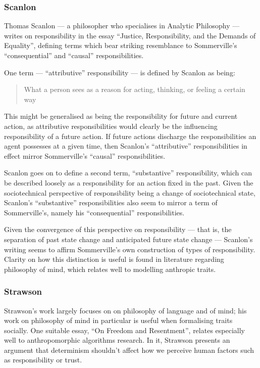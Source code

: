 \subsubsection{Scanlon~\cite{scanlon2006justice}}  %
Thomas Scanlon --- a philosopher who specialises in Analytic Philosophy --- writes on responsibility in the essay ``Justice, Responsibility, and the Demands of Equality'', defining terms which bear striking resemblance to Sommerville's ``consequential'' and ``causal'' responsibilities.\par

One term --- ``attributive'' responsibility --- is defined by Scanlon as being:

\begin{quotation}
    What a person sees as a reason for acting, thinking, or feeling a certain way\cite{scanlon2006justice}
\end{quotation}

This might be generalised as being the responsibility for future and current action, as attributive responsibilities would clearly be the influencing responsibility of a future action. If future actions discharge the responsibilities an agent possesses at a given time, then Scanlon's ``attributive'' responsibilities in effect mirror Sommerville's ``causal'' responsibilities.\par

Scanlon goes on to define a second term, ``substantive'' responsibility, which can be described loosely as a responsibility for an action fixed in the past. Given the sociotechnical perspective of responsibility being a change of sociotechnical state, Scanlon's ``substantive'' responsibilities also seem to mirror a term of Sommerville's, namely his ``consequential'' responsibilities.\par

Given the convergence of this perspective on responsibility --- that is, the separation of past state change and anticipated future state change --- Scanlon's writing seems to affirm Sommerville's own construction of types of responsibility. Clarity on how this distinction is useful is found in literature regarding philosophy of mind, which relates well to modelling anthropic traits.\par

\subsubsection{Strawson~\cite{strawson}}  %
Strawson's work largely focuses on on philosophy of language and of mind; his work on philosophy of mind in particular is useful when formalising traits socially. One suitable essay, ``On Freedom and Resentment''\cite{strawson}, relates especially well to anthropomorphic algorithms research. In it, Strawson presents an argument that determinism shouldn't affect how we perceive human factors such as responsibility or trust.\par

